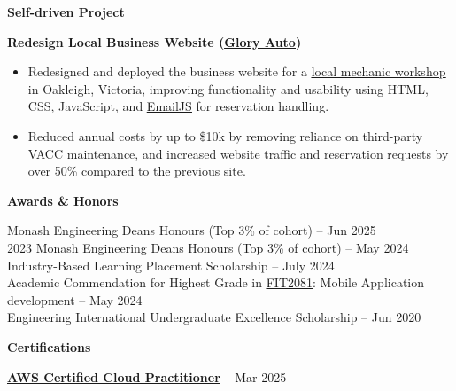 \documentclass[11pt, a4paper]{article}
\let\hrefnoul\href
\renewcommand{\href}[2]{\hrefnoul{#1}{\ul{#2}}}
\newcommand{\resumesection}[1]{%
  \vspace{8pt}\par
  {\setlength{\fboxsep}{5pt}%
   \noindent\colorbox{sectionbg}{%
     \parbox{\dimexpr\linewidth-10pt\relax}{\strut\textbf{\large #1}\strut}%
   }}%
  \vspace{2pt}\par
}
\begin{document}
\resumesection{Self-driven Project}

\vspace{4pt}
\noindent\textbf{Redesign Local Business Website
(\href{https://www.gloryauto.com.au/}{Glory Auto})}

\begin{itemize}[leftmargin=1.5em, itemsep=3pt, topsep=2pt, parsep=0pt]
  \item Redesigned and deployed the business website for a
        \href{https://github.com/JayReeMarine/Mechanic-Workshop-Page}{local mechanic workshop} in Oakleigh, Victoria, improving
        functionality and usability using HTML, CSS, JavaScript, and
        \href{https://www.emailjs.com}{EmailJS} for reservation handling.

  \item Reduced annual costs by up to \$10k by removing reliance on third-party VACC
        maintenance, and increased website traffic and reservation requests by over 50\%
        compared to the previous site.
\end{itemize}

\resumesection{Awards \& Honors}

\vspace{4pt}
 Monash Engineering Deans Honours (Top 3\% of cohort) – Jun 2025\\
2023 Monash Engineering Deans Honours (Top 3\% of cohort) – May 2024\\
Industry-Based Learning Placement Scholarship – July 2024\\
Academic Commendation for Highest Grade in
\href{https://handbook.monash.edu/2024/units/FIT2081}{FIT2081}:
Mobile Application development – May 2024\\
Engineering International Undergraduate Excellence Scholarship – Jun 2020

\resumesection{Certifications}

\vspace{4pt}
\noindent\href{https://aws.amazon.com/certification/certified-cloud-practitioner/}{\textbf{AWS Certified Cloud Practitioner}}
– Mar 2025

\end{document}
